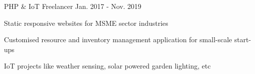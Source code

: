\begin{cventries}
  \cventry
    {PHP \& IoT} %
    {Freelancer} %
    {} %
    {Jan. 2017 - Nov. 2019} %
    {
      \begin{cvitems} %
        \item {Static responsive websites for MSME sector industries}
        \item {Customised resource and inventory management application for small-scale start-ups}
        \item {IoT projects like weather sensing, solar powered garden lighting, etc}
      \end{cvitems}
    }

\end{cventries}
